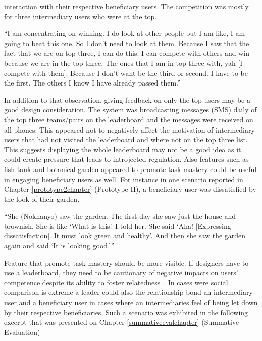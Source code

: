 interaction with their respective beneficiary users. The competition was mostly for three intermediary users who were at the top.  

 {``I am concentrating on winning. I do look at other people but I am like, I am going to beat this one. So I don't need to look at them. Because I saw that the fact that we are on top three, I can do this. I can compete with others and win because we are in the top three. The ones that I am in top three with, yah [I compete with them]. Because I don't want be the third or second. I have to be the first. The others I know I have already passed them.''}

In addition to that observation, giving feedback on only the top users may be a good design consideration. The system was broadcasting messages (SMS) daily of the top three teams/pairs on the leaderboard and the messages were received on all phones. This appeared not to negatively affect the motivation of intermediary users that had not visited the leaderboard and where not on the top three list. This suggests displaying the whole leaderboard may not be a good idea as it could create pressure that leads to introjected regulation. Also features such as fish tank and botanical garden appeared to promote task mastery could be useful in engaging beneficiary users as well. For instance in one scenario reported in Chapter \ref{prototype2chapter} (Prototype II),  a beneficiary user was dissatisfied by the look of their garden. 

 {``She (Nokhanyo) saw the garden. The first day she saw just the house and brownish. She is like `What is this'. I told her. She said `Aha! [Expressing
dissatisfaction]. It must look green and healthy'. And then
she saw the garden again and said `It is looking good.'''}

Feature that promote task mastery should be more visible. If designers have to use a leaderboard, they need to be cautionary of negative impacts on users' competence despite its ability to foster relatedness~\citep{sailer2013:psychological}. In cases were social comparison is extreme a leader could also  the relationship bond an intermediary user and a beneficiary user in cases where an intermediaries feel of being let down by their respective beneficiaries. Such a scenario was exhibited in the following excerpt that was presented on Chapter \ref{summativeevalchapter} (Summative Evaluation)
 
